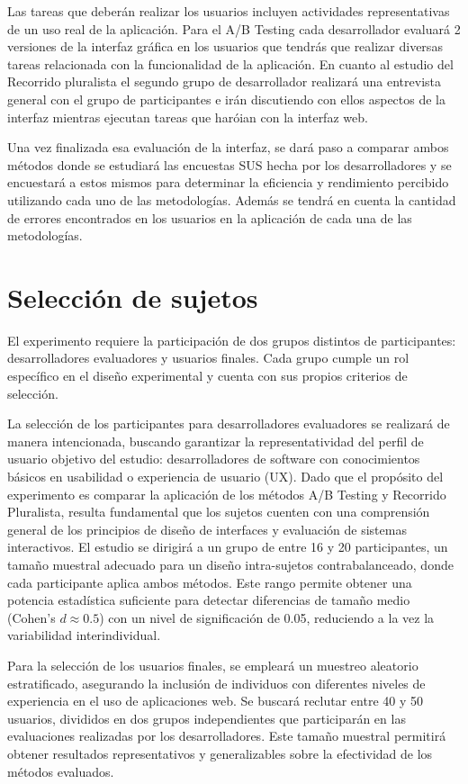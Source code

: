 \documentclass[a4paper,12pt]{report}
\begin{document}
Las tareas que deberán realizar los usuarios incluyen actividades representativas de un uso real de la aplicación. Para el A/B Testing cada desarrollador evaluará 2 versiones de la interfaz gráfica en los usuarios que tendrás que realizar diversas tareas relacionada con la funcionalidad de la aplicación. En cuanto al estudio del Recorrido pluralista el segundo grupo de desarrollador realizará una entrevista general con el grupo de participantes e irán discutiendo con ellos aspectos de la interfaz mientras ejecutan tareas que haróian con la interfaz web.


Una vez finalizada esa evaluación de la interfaz, se dará paso a comparar ambos métodos donde se estudiará las encuestas SUS hecha por los desarrolladores y se encuestará a estos mismos para determinar la eficiencia y rendimiento percibido utilizando cada uno de las metodologías. Además se tendrá en cuenta la cantidad de errores encontrados en los usuarios en la aplicación de cada una de las metodologías.


\section{Selección de sujetos}
El experimento requiere la participación de dos grupos distintos de participantes: desarrolladores evaluadores y usuarios finales. Cada grupo cumple un rol específico en el diseño experimental y cuenta con sus propios criterios de selección.

La selección de los participantes para desarrolladores evaluadores se realizará de manera intencionada, buscando garantizar la representatividad del perfil de usuario objetivo del estudio: desarrolladores de software con conocimientos básicos en usabilidad o experiencia de usuario (UX). Dado que el propósito del experimento es comparar la aplicación de los métodos A/B Testing y Recorrido Pluralista, resulta fundamental que los sujetos cuenten con una comprensión general de los principios de diseño de interfaces y evaluación de sistemas interactivos.
El estudio se dirigirá a un grupo de entre 16 y 20 participantes, un tamaño muestral adecuado para un diseño intra-sujetos contrabalanceado, donde cada participante aplica ambos métodos. Este rango permite obtener una potencia estadística suficiente para detectar diferencias de tamaño medio (Cohen's $d \approx 0.5$) con un nivel de significación de 0.05, reduciendo a la vez la variabilidad interindividual.

Para la selección de los usuarios finales, se empleará un muestreo aleatorio estratificado, asegurando la inclusión de individuos con diferentes niveles de experiencia en el uso de aplicaciones web. Se buscará reclutar entre 40 y 50 usuarios, divididos en dos grupos independientes que participarán en las evaluaciones realizadas por los desarrolladores. Este tamaño muestral permitirá obtener resultados representativos y generalizables sobre la efectividad de los métodos evaluados.
\end{document}
